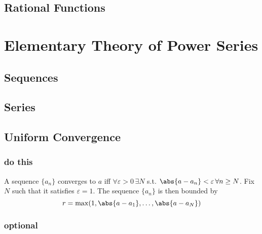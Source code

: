\subsection{Rational Functions}
\subsubsection{}
\subsubsection{}
\subsubsection{}
\subsubsection{}
\subsubsection{}
\subsubsection{}

\section{Elementary Theory of Power Series}
\subsection{Sequences}

\subsection{Series}

\subsection{Uniform Convergence}
\subsubsection{do this}
A sequence \(\{a_n\}\) converges to \(a\) iff \(\forall\varepsilon>0\,\exists N\) s.t. \(\abs{a-a_n}<\varepsilon\,\forall n\geq N\). Fix \(N\) such that it satisfies \(\varepsilon=1\). The sequence \(\{a_n\}\) is then bounded by
\[r=\max(1,\abs{a-a_1},\ldots,\abs{a-a_N})\]
\subsubsection{optional}
